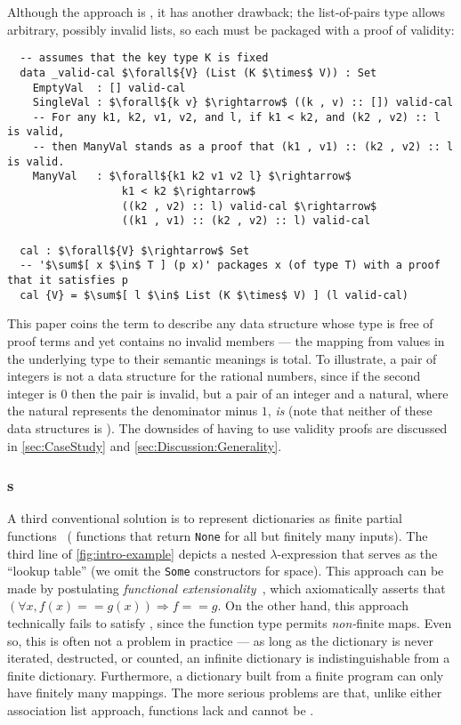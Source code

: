 Although the \cal{} approach is \extensional, it has another drawback; the list-of-pairs type allows arbitrary, possibly invalid lists, so each \cal{} must be packaged with a proof of validity:
\begin{lstlisting}
  -- assumes that the key type K is fixed
  data _valid-cal $\forall${V} (List (K $\times$ V)) : Set
    EmptyVal  : [] valid-cal
    SingleVal : $\forall${k v} $\rightarrow$ ((k , v) :: []) valid-cal
    -- For any k1, k2, v1, v2, and l, if k1 < k2, and (k2 , v2) :: l is valid,
    -- then ManyVal stands as a proof that (k1 , v1) :: (k2 , v2) :: l is valid.
    ManyVal   : $\forall${k1 k2 v1 v2 l} $\rightarrow$
                  k1 < k2 $\rightarrow$
                  ((k2 , v2) :: l) valid-cal $\rightarrow$
                  ((k1 , v1) :: (k2 , v2) :: l) valid-cal

  cal : $\forall${V} $\rightarrow$ Set
  -- '$\sum$[ x $\in$ T ] (p x)' packages x (of type T) with a proof that it satisfies p
  cal {V} = $\sum$[ l $\in$ List (K $\times$ V) ] (l valid-cal)
\end{lstlisting}

This paper coins the term \firstUseGoal{\semanticallyTotal} to describe any data structure whose type is free of proof terms and yet contains no invalid members ---
%
\ie{} the mapping from values in the underlying type to their semantic meanings is total.
%
To illustrate, a pair of integers is not a \semanticallyTotal{} data structure for the rational numbers, since if the second integer is $0$ then the pair is invalid,
%
but a pair of an integer and a natural, where the natural represents the denominator minus $1$, \emph{is} \semanticallyTotal{} (note that neither of these data structures is \extensional).
%
The downsides of having to use validity proofs are discussed in \autoref{sec:CaseStudy} and \autoref{sec:Discussion:Generality}.

\subsubsection{\Fpf{}s}

A third conventional solution is to represent dictionaries as finite partial functions~\cite[Maps]{Pierce:SF1} (\ie{} functions that return \texttt{None} for all but finitely many inputs).
%
The third line of \autoref{fig:intro-example} depicts a nested $\lambda$-expression that serves as the ``lookup table'' (we omit the \texttt{Some} constructors for space).
%
This approach can be made \extensional{} by postulating \emph{functional extensionality}~\mbox{\cite[Logic]{Pierce:SF1}}, which axiomatically asserts that $(\forall x, f(x) == g(x)) \Rightarrow f == g$.
%
On the other hand, this approach technically fails to satisfy \SemTot, since the function type permits \emph{non-}finite maps.
%
Even so, this is often not a problem in practice --- as long as the dictionary is never iterated, destructed, or counted, an infinite dictionary is indistinguishable from a finite dictionary.
%
Furthermore, a dictionary built from a finite program can only have finitely many mappings.
%
The more serious problems are that, unlike either association list approach, functions lack \firstUseGoal{\DecidableEq} and cannot be \firstUseGoal{\destructed}.

